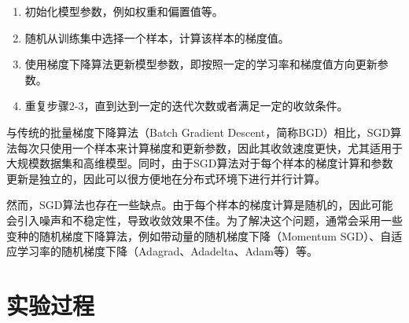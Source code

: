 \documentclass{report}
\begin{document}
	\begin{enumerate}
		\item 初始化模型参数，例如权重和偏置值等。
		\item 随机从训练集中选择一个样本，计算该样本的梯度值。
		\item 使用梯度下降算法更新模型参数，即按照一定的学习率和梯度值方向更新参数。
		\item 重复步骤2-3，直到达到一定的迭代次数或者满足一定的收敛条件。
	\end{enumerate}
	
	与传统的批量梯度下降算法（Batch Gradient Descent，简称BGD）相比，SGD算法每次只使用一个样本来计算梯度和更新参数，因此其收敛速度更快，尤其适用于大规模数据集和高维模型。同时，由于SGD算法对于每个样本的梯度计算和参数更新是独立的，因此可以很方便地在分布式环境下进行并行计算。
	
	然而，SGD算法也存在一些缺点。由于每个样本的梯度计算是随机的，因此可能会引入噪声和不稳定性，导致收敛效果不佳。为了解决这个问题，通常会采用一些变种的随机梯度下降算法，例如带动量的随机梯度下降（Momentum SGD）、自适应学习率的随机梯度下降（Adagrad、Adadelta、Adam等）等。

	
	\section{实验过程}
\end{document}
